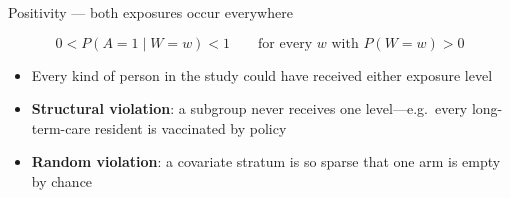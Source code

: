 \documentclass[aspectratio=169,10pt]{beamer}
\begin{document}
\begin{frame}[t]{Positivity --- both exposures occur everywhere}
  \vspace*{0.35cm}

  \[
    0 < P(A = 1 \mid W = w) < 1
    \qquad \text{for every } w \text{ with } P(W = w) > 0
  \]

  \vspace{0.3em}
  \begin{itemize}
    \item Every kind of person in the study could have received either
      exposure level
    \item \textbf{Structural violation}: a subgroup never receives one
      level---e.g.\ every long-term-care resident is vaccinated by policy
    \item \textbf{Random violation}: a covariate stratum is so sparse
      that one arm is empty by chance
  \end{itemize}

  \vspace{0.6em}
  \begin{center}
  \end{center}
\end{frame}
\end{document}
